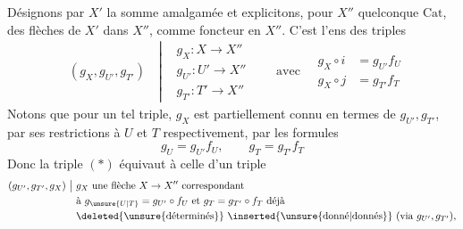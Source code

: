 Désignons par $X'$ la somme amalgamée et
 explicitons, pour $X''$ quelconque  $\mathrm{Cat}$,
 des flèches  de $X'$ dans $X''$,  comme
foncteur en $X''$. C'est l'ens des triples
\[
\begin{aligned}
&(g_X,g_{U'},g_{T'})\quad
\left|\begin{aligned}
&g_X:X\to X''\\
&g_{U'}:U'\to X''\\
&g_{T'}:T'\to X''
\end{aligned}\right.\qquad\text{avec}\quad
\begin{aligned}
g_X\circ i&=g_{U'}f_U\\
g_X\circ j&=g_{T'}f_T
\end{aligned}
\end{aligned}\tag*{(*)}
\]
Notons que pour un tel triple,
$g_X$ est partiellement connu  en termes
de $g_{U'},g_{T'}$, par ses restrictions  à
$U$ et $T$ respectivement, par les formules
\[
g_U=g_{U'}f_U,\qquad g_T=g_{T'}f_T
\]
Donc la  triple $(*)$ équivaut à celle d'un
triple
\[
\begin{aligned}
(g_{U'},g_{T'},g_X)\ \big|\ &g_X\text{ une flèche }X\to X''\text{ correspondant}\\
&\text{à }g_{\unsure{U|T}}=g_{U'}\circ f_U\text{ et }g_T=g_{T'}\circ f_T\text{ déjà}\\
&\deleted{\text{\unsure{déterminés}}}\ \text{\inserted{\unsure{donné|donnés}} (via }g_{U'},g_{T'}\text{),}
\end{aligned}
\]
